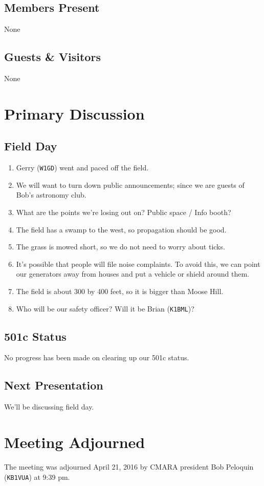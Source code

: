 \documentclass[10pt,letterpaper]{article}
\begin{document}
\subsection{Members Present}

None

\subsection{Guests \& Visitors}

None

\section{Primary Discussion}

\subsection{Field Day}
\begin{enumerate}
  \item Gerry (\texttt{W1GD}) went and paced off the field.
  \item We will want to turn down public announcements; since we are guests of Bob's astronomy club.
  \item What are the points we're losing out on? Public space / Info booth?
  \item The field has a swamp to the west, so propagation should be good.
  \item The grass is mowed short, so we do not need to worry about ticks.
  \item It's possible that people will file noise complaints. To avoid this, we can point our generators away from houses and put a vehicle or shield around them.
  \item The field is about 300 by 400 feet, so it is bigger than Moose Hill.
  \item Who will be our safety officer? Will it be Brian (\texttt{K1BML})?
\end{enumerate}

\subsection{501c Status}

No progress has been made on clearing up our 501c status.

\subsection{Next Presentation}

We'll be discussing field day.

\section{Meeting Adjourned}
The meeting was adjourned April 21, 2016 by CMARA president Bob Peloquin (\texttt{KB1VUA}) at 9:39 pm.
\end{document}
